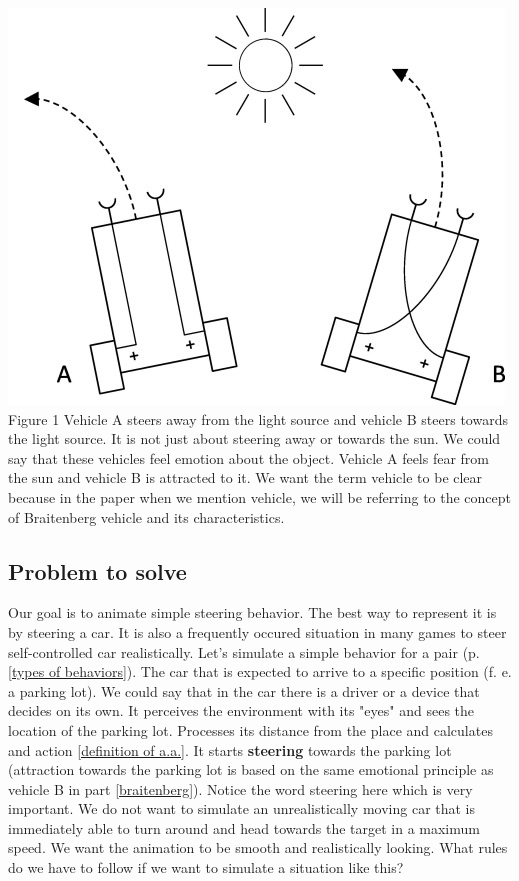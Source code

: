 \documentclass[10pt,twoside,english,a4paper]{article}
\begin{document}
\bigbreak

\includegraphics[scale=0.45]{braitenberg.jpg}
\quad Figure 1
\bigbreak
Vehicle A steers away from the light source and vehicle B steers 
towards the light source. It is not just about steering away or 
towards the sun. We could say that these vehicles feel emotion about 
the object. Vehicle A feels fear from the sun and vehicle B is 
attracted to it. We want the term vehicle to be clear because in 
the paper when we mention vehicle, we will be referring to the 
concept of Braitenberg vehicle and its characteristics. 

\subsection{Problem to solve} \label{problem to solve}
Our goal is to animate simple steering behavior. The best way to represent
it is by steering a car. It is also a frequently occured situation 
in many games to steer self-controlled car realistically.
Let’s simulate a simple behavior for a pair 
(p. \ref{types of behaviors}). The car that 
is expected to arrive to a specific position (f. e. a parking lot). 
We could say that in the car there is a driver or a device that decides on its own.
It  perceives the environment with its "eyes" and sees the location of the parking 
lot. Processes its distance from the place and calculates and action \ref{definition of a.a.}. 
It starts \textbf{steering} towards the parking lot (attraction towards the 
parking lot is based on the same emotional principle as vehicle B in part \ref{braitenberg}). 
Notice the word steering here which is very important. We do not want 
to simulate an unrealistically moving car that is immediately able to 
turn around and head towards the target in a maximum speed. We want the 
animation to be smooth and realistically looking. What rules do we 
have to follow if we want to simulate a situation like this?
\end{document}
